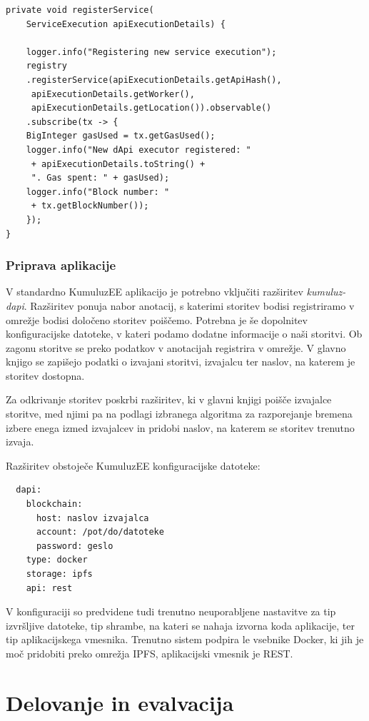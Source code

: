 \documentclass[a4paper, 12pt]{book}
\begin{document}
\begin{lstlisting}
private void registerService(
	ServiceExecution apiExecutionDetails) {
	
	logger.info("Registering new service execution");
	registry
	.registerService(apiExecutionDetails.getApiHash(),
	 apiExecutionDetails.getWorker(),
	 apiExecutionDetails.getLocation()).observable()
	.subscribe(tx -> {
	BigInteger gasUsed = tx.getGasUsed();
	logger.info("New dApi executor registered: "
	 + apiExecutionDetails.toString() + 
	 ". Gas spent: " + gasUsed);
	logger.info("Block number: "
	 + tx.getBlockNumber());
	});
}
\end{lstlisting}


\subsection{Priprava aplikacije}
V standardno KumuluzEE aplikacijo je potrebno vključiti razširitev \textit{kumuluz-dapi}. 
Razširitev ponuja nabor anotacij, s katerimi storitev bodisi registriramo v omrežje bodisi določeno storitev poiščemo.
Potrebna je še dopolnitev konfiguracijske datoteke, v kateri podamo dodatne informacije o naši storitvi.
Ob zagonu storitve se preko podatkov v anotacijah registrira v omrežje.
V glavno knjigo se zapišejo podatki o izvajani storitvi, izvajalcu ter naslov, na katerem je storitev dostopna.

Za odkrivanje storitev poskrbi razširitev, ki v glavni knjigi poišče izvajalce storitve, med njimi pa na podlagi izbranega algoritma za razporejanje bremena izbere enega izmed izvajalcev in pridobi naslov, na katerem se storitev trenutno izvaja.

Razširitev obstoječe KumuluzEE konfiguracijske datoteke:
\begin{lstlisting}
  dapi:
    blockchain:
      host: naslov izvajalca
      account: /pot/do/datoteke
      password: geslo
    type: docker
    storage: ipfs
    api: rest
\end{lstlisting}

V konfiguraciji so predvidene tudi trenutno neuporabljene nastavitve za tip izvršljive datoteke, tip shrambe, na kateri se nahaja izvorna koda aplikacije, ter tip aplikacijskega vmesnika.
Trenutno sistem podpira le vsebnike Docker, ki jih je moč pridobiti preko omrežja IPFS, aplikacijski vmesnik je REST.


\chapter{Delovanje in evalvacija}
\end{document}
